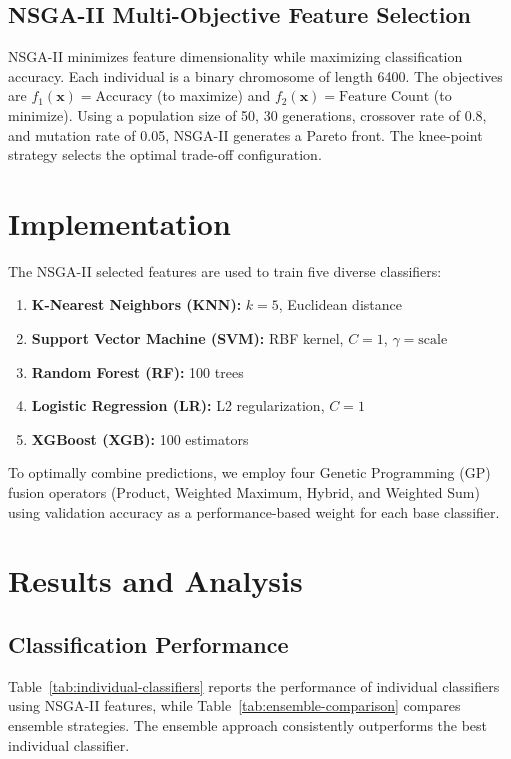 \documentclass[11pt,a4paper]{article}
\begin{document}
\subsection{NSGA-II Multi-Objective Feature Selection}
NSGA-II minimizes feature dimensionality while maximizing classification accuracy. Each individual is a binary chromosome of length 6400. The objectives are $f_1(\mathbf{x}) = \text{Accuracy}$ (to maximize) and $f_2(\mathbf{x}) = \text{Feature Count}$ (to minimize). Using a population size of 50, 30 generations, crossover rate of 0.8, and mutation rate of 0.05, NSGA-II generates a Pareto front. The knee-point strategy selects the optimal trade-off configuration.

\section{Implementation}

The NSGA-II selected features are used to train five diverse classifiers:
\begin{enumerate}
    \item \textbf{K-Nearest Neighbors (KNN):} $k=5$, Euclidean distance
    \item \textbf{Support Vector Machine (SVM):} RBF kernel, $C=1$, $\gamma=\text{scale}$
    \item \textbf{Random Forest (RF):} 100 trees
    \item \textbf{Logistic Regression (LR):} L2 regularization, $C=1$
    \item \textbf{XGBoost (XGB):} 100 estimators
\end{enumerate}

To optimally combine predictions, we employ four Genetic Programming (GP) fusion operators (Product, Weighted Maximum, Hybrid, and Weighted Sum) using validation accuracy as a performance-based weight for each base classifier.

\section{Results and Analysis}

\subsection{Classification Performance}
Table~\ref{tab:individual-classifiers} reports the performance of individual classifiers using NSGA-II features, while Table~\ref{tab:ensemble-comparison} compares ensemble strategies. The ensemble approach consistently outperforms the best individual classifier.
\end{document}
